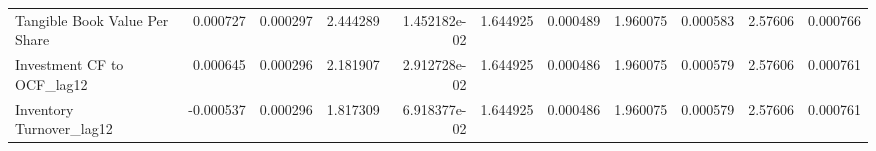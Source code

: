 \documentclass[12pt,a4paper,english]{article}
\begin{document}
{{\begin{tabular}{@{}lrrrrrrrrrr@{}}
			Tangible Book Value Per Share  & 0.000727                 & 0.000297                    & 2.444289                  & 1.452182e-02                             & 1.644925                      & 0.000489                      & 1.960075                     & 0.000583                     & 2.57606                      & 0.000766                     \\
			Investment CF to OCF\_lag12    & 0.000645                 & 0.000296                    & 2.181907                  & 2.912728e-02                             & 1.644925                      & 0.000486                      & 1.960075                     & 0.000579                     & 2.57606                      & 0.000761                     \\
			Inventory Turnover\_lag12      & -0.000537                & 0.000296                    & 1.817309                  & 6.918377e-02                             & 1.644925                      & 0.000486                      & 1.960075                     & 0.000579                     & 2.57606                      & 0.000761                     \\ \bottomrule
		\end{tabular}%
	}
}
\end{document}
